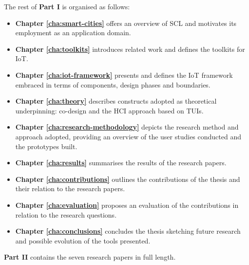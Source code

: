The rest of \textbf{Part I} is organised as follows:

\begin{itemize}
    \item \textbf{Chapter \ref{cha:smart-cities}} offers an overview of SCL and motivates its employment as an application domain.

	\item \textbf{Chapter \ref{cha:toolkits}} introduces related work and defines the toolkits for IoT.
	
	\item \textbf{Chapter \ref{cha:iot-framework}} presents and defines the IoT framework embraced in terms of components, design phases and boundaries.
	
	\item \textbf{Chapter \ref{cha:theory}} describes constructs adopted as theoretical underpinning: co-design and the HCI approach based on TUIs.

	\item \textbf{Chapter \ref{cha:research-methodology}} depicts the research method and approach adopted, providing an overview of the user studies conducted and the prototypes built.

	\item \textbf{Chapter \ref{cha:results}} summarises the results of the research papers.

	\item \textbf{Chapter \ref{cha:contributions}} outlines the contributions of the thesis and their relation to the research papers.

	\item \textbf{Chapter \ref{cha:evaluation}} proposes an evaluation of the contributions in relation to the research questions.

	\item \textbf{Chapter \ref{cha:conclusions}} concludes the thesis sketching future research and possible evolution of the tools presented.
\end{itemize}

\textbf{Part II} contains the seven research papers in full length.